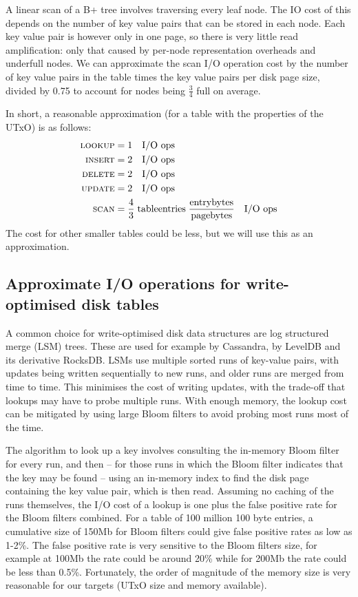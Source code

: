 \documentclass[11pt,a4paper]{article}
\begin{document}
A linear scan of a B+ tree involves traversing every leaf node. The IO cost of
this depends on the number of key value pairs that can be stored in each node.
Each key value pair is however only in one page, so there is very little read
amplification: only that caused by per-node representation overheads and
underfull nodes. We can approximate the {\sc scan} I/O operation cost by the
number of key value pairs in the table times the key value pairs per disk page
size, divided by 0.75 to account for nodes being $\frac{3}{4}$ full on average.

In short, a reasonable approximation (for a table with the properties of the
UTxO) is as follows:
\begin{equation}\label{eq:io-ops-read-optimised}
\begin{aligned}
\text{\sc lookup} & = 1 \quad \text{I/O ops} \\
\text{\sc insert} & = 2 \quad \text{I/O ops} \\
\text{\sc delete} & = 2 \quad \text{I/O ops} \\
\text{\sc update} & = 2 \quad \text{I/O ops} \\
\text{\sc scan}   & = \frac{4}{3} \; \text{tableentries} \; \frac{\text{entrybytes}}{\text{pagebytes}} \quad \text{I/O ops} \\
\end{aligned}
\end{equation}
The cost for other smaller tables could be less, but we will use this as an
approximation.

\subsection{Approximate I/O operations for write-optimised disk tables}

A common choice for write-optimised disk data structures are log structured
merge (LSM) trees. These are used for example by Cassandra, by LevelDB and its
derivative RocksDB. LSMs use multiple sorted runs of key-value pairs, with
updates being written sequentially to new runs, and older runs are merged from
time to time. This minimises the cost of writing updates, with the trade-off
that lookups may have to probe multiple runs. With enough memory, the lookup
cost can be mitigated by using large Bloom filters to avoid probing most runs
most of the time.

The algorithm to look up a key involves consulting the in-memory Bloom filter
for every run, and then -- for those runs in which the Bloom filter indicates
that the key may be found -- using an in-memory index to find the disk page
containing the key value pair, which is then read. Assuming no caching of the
runs themselves, the I/O cost of a lookup is one plus the false positive rate
for the Bloom filters combined. For a table of 100 million 100 byte entries, a cumulative size of 150Mb for
Bloom filters could give false positive rates as low as 1-2\%. The false
positive rate is very sensitive to the Bloom filters size, for example at 100Mb
the rate could be around 20\% while for 200Mb the rate could be less than 0.5\%.
Fortunately, the order of magnitude of the memory size is very reasonable for
our targets (UTxO size and memory available).
\end{document}
